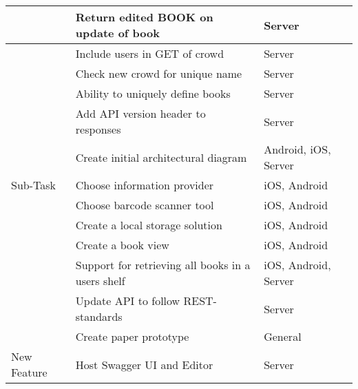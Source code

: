 \begin{table}[]
\begin{tabular}{|L{2cm}|L{10cm}|L{3cm}|}
 & Return edited BOOK on update of book & Server \\
 \hline
 & Include users in GET of crowd & Server \\
 \hline
 & Check new crowd for unique name & Server \\
 \hline
 & Ability to uniquely define books & Server \\
 \hline
 & Add API version header to responses & Server \\
 \hline
  & Create initial architectural diagram & Android, iOS, Server \\
  \hline
Sub-Task & Choose information provider & iOS, Android \\
\hline
 & Choose barcode scanner tool & iOS, Android \\
 \hline
 & Create a local storage solution & iOS, Android \\
 \hline
 & Create a book view & iOS, Android \\
 \hline
 & Support for retrieving all books in a users shelf & iOS, Android, Server \\
 \hline
 & Update API to follow REST-standards & Server \\
 \hline
 & Create paper prototype & General \\
 \hline
New Feature & Host Swagger UI and Editor & Server \\
\hline


\end{tabular}

\end{table}